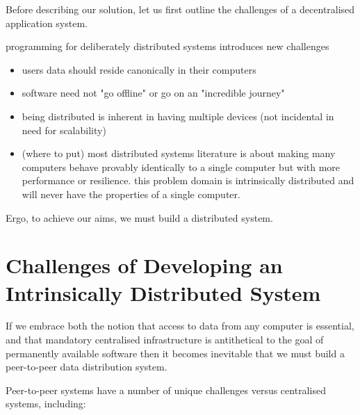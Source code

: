 \documentclass[sigplan,10pt]{acmart}
\begin{document}
Before describing our solution, let us first outline the challenges of a decentralised application system.

programming for deliberately distributed systems introduces new challenges
\begin{itemize}
    \item users data should reside canonically in their computers
    \item software need not "go offline" or go on an "incredible journey"
    \item being distributed is inherent in having multiple devices (not incidental in need for scalability)
    \item (where to put) most distributed systems literature is about making many computers behave provably identically to a single computer but with more performance or resilience. this problem domain is intrinsically distributed and will never have the properties of a single computer.
\end{itemize}
Ergo, to achieve our aims, we must build a distributed system.

\section{Challenges of Developing an Intrinsically Distributed System}

If we embrace both the notion that access to data from any computer is essential, and that mandatory centralised infrastructure is antithetical to the goal of permanently available software then it becomes inevitable that we must build a peer-to-peer data distribution system. 

Peer-to-peer systems have a number of unique challenges versus centralised systems, including:
\end{document}
